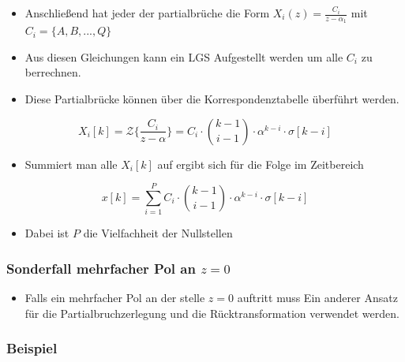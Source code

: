 \documentclass[11pt]{article}
\providecommand{\tightlist}{%
      \setlength{\itemsep}{0pt}\setlength{\parskip}{0pt}}
\begin{document}
    \begin{itemize}
\tightlist
\item
  Anschließend hat jeder der partialbrüche die Form
  \(X_i(z) = \frac{C_i}{z-\alpha_1}\) mit \(C_i = \{A, B, ..., Q\}\)
\end{itemize}

    \begin{itemize}
\tightlist
\item
  Aus diesen Gleichungen kann ein LGS Aufgestellt werden um alle \(C_i\)
  zu berrechnen.
\end{itemize}

    \begin{itemize}
\tightlist
\item
  Diese Partialbrücke können über die Korrespondenztabelle überführt
  werden.
\end{itemize}

\[X_i[k] = \mathcal{Z}\big\{\frac{C_i}{z-\alpha}\big\} = C_i \cdot \binom{k-1}{i-1} \cdot \alpha^{k-i} \cdot \sigma[k-i]\]

    \begin{itemize}
\tightlist
\item
  Summiert man alle \(X_i[k]\) auf ergibt sich für die Folge im
  Zeitbereich
\end{itemize}

\[x[k] = \sum_{i=1}^P C_i \cdot \binom{k-1}{i-1} \cdot \alpha^{k-i} \cdot \sigma[k-i]\]

\begin{itemize}
\tightlist
\item
  Dabei ist \(P\) die Vielfachheit der Nullstellen
\end{itemize}

    \subsubsection{\texorpdfstring{Sonderfall mehrfacher Pol an
\(z = 0\)}{Sonderfall mehrfacher Pol an z = 0}}\label{sonderfall-mehrfacher-pol-an-z-0}

\begin{itemize}
\tightlist
\item
  Falls ein mehrfacher Pol an der stelle \(z = 0\) auftritt muss Ein
  anderer Ansatz für die Partialbruchzerlegung und die
  Rücktransformation verwendet werden.
\end{itemize}

    \subsubsection{Beispiel}\label{beispiel}
\end{document}

